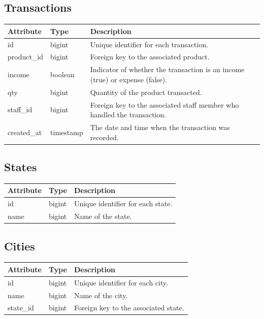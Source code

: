 \documentclass{scrreprt}
\begin{document}
\subsection*{Transactions}
\begin{tabular}{|m{2.5cm}|m{2.5cm}|m{6cm}|}
\hline
\textbf{Attribute} & \textbf{Type} & \textbf{Description} \\
\hline
id & bigint & Unique identifier for each transaction. \\
\hline
product\_id & bigint & Foreign key to the associated product. \\
\hline
income & boolean & Indicator of whether the transaction is an income (true) or expense (false). \\
\hline
qty & bigint & Quantity of the product transacted. \\
\hline
staff\_id & bigint & Foreign key to the associated staff member who handled the transaction. \\
\hline
created\_at & timestamp & The date and time when the transaction was recorded. \\
\hline
\end{tabular}

\subsection*{States}
\begin{tabular}{|m{2.5cm}|m{2.5cm}|m{6cm}|}
\hline
\textbf{Attribute} & \textbf{Type} & \textbf{Description} \\
\hline
id & bigint & Unique identifier for each state. \\
\hline
name & bigint & Name of the state. \\
\hline
\end{tabular}

\subsection*{Cities}
\begin{tabular}{|m{2.5cm}|m{2.5cm}|m{6cm}|}
\hline
\textbf{Attribute} & \textbf{Type} & \textbf{Description} \\
\hline
id & bigint & Unique identifier for each city. \\
\hline
name & bigint & Name of the city. \\
\hline
state\_id & bigint & Foreign key to the associated state. \\
\hline
\end{tabular}
\end{document}
